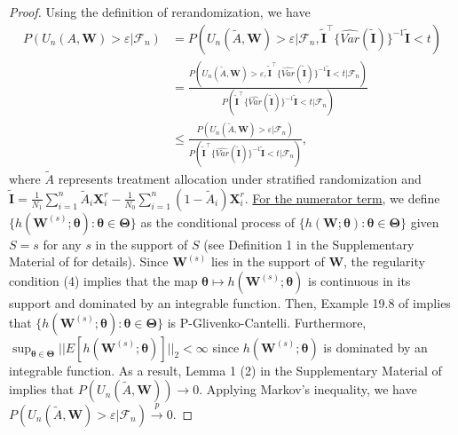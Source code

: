 \documentclass[12pt]{article}
\newcommand{\bX}{\boldsymbol{X}}
\newcommand{\bW}{\boldsymbol{W}}
\newcommand{\bI}{\boldsymbol{I}}
\newcommand{\btheta}{\boldsymbol{\theta}}
\newcommand{\bTheta}{\boldsymbol{\Theta}}
\newcommand{\tA}{\widetilde{A}}
\begin{document}
\begin{proof}
Using the definition of rerandomization, we have 
\begin{align*}
    P\left(U_n(A,\bW) > \varepsilon | \mathcal{F}_n\right) &= P\left(U_n(\tA,\bW) > \varepsilon | \mathcal{F}_n, \widetilde{\bI}^\top \{\widehat{Var}(\widetilde{\bI})\}^{-1} \widetilde{\bI} < t\right) \\
    &= \frac{ P\left(U_n(\tA,\bW) > \varepsilon, \widetilde{\bI}^\top \{\widehat{Var}(\widetilde{\bI})\}^{-1} \widetilde{\bI} < t | \mathcal{F}_n\right)}{P\left(\widetilde{\bI}^\top \{\widehat{Var}(\widetilde{\bI})\}^{-1} \widetilde{\bI} < t | \mathcal{F}_n\right)} \\
    &\le \frac{ P\left(U_n(\tA,\bW) > \varepsilon | \mathcal{F}_n\right)}{P\left(\widetilde{\bI}^\top \{\widehat{Var}(\widetilde{\bI})\}^{-1} \widetilde{\bI} < t | \mathcal{F}_n\right)},
\end{align*}
where $\tA$ represents treatment allocation under stratified randomization and $\widetilde{\bI} = \frac{1}{N_1} \sum_{i=1}^n \tA_i \bX^r_i - \frac{1}{N_0} \sum_{i=1}^n (1-\tA_i) \bX^r_i$.
\underline{For the numerator term}, we define $\{h(\bW^{(s)};\btheta): \btheta \in \bTheta\}$ as the conditional process of $\{h(\bW;\btheta): \btheta \in \bTheta\}$ given $S=s$ for any $s$ in the support of $S$ (see Definition 1 in the Supplementary Material of \cite{wang2023model} for details). Since $\bW^{(s)}$ lies in the support of $\bW$, the regularity condition (4) implies that the map $\btheta \mapsto h(\bW^{(s)};\btheta)$ is continuous in its support and dominated by an integrable function. Then, Example 19.8 of \cite{vaart_1998} implies that $\{h(\bW^{(s)};\btheta): \btheta \in \bTheta\}$ is P-Glivenko-Cantelli. Furthermore, $\sup_{\btheta \in \bTheta} ||E[h(\bW^{(s)};\btheta)]||_2 < \infty$ since $h(\bW^{(s)};\btheta)$ is dominated by an integrable function. As a result, Lemma 1 (2) in the Supplementary Material of \cite{wang2023model} implies that $ P\left(U_n(\tA,\bW)\right) \rightarrow 0$. Applying Markov's inequality, we have $P\left(U_n(\tA,\bW) > \varepsilon| \mathcal{F}_n\right) \xrightarrow{p} 0$.

\end{proof}
\end{document}
